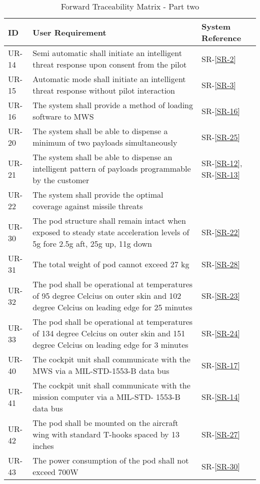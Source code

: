 \documentclass[Main]{subfiles}
\begin{document}
\begin{table}[htbp]
	\centering
	\begin{tabular}{l p{10cm} l} \hline
	ID & User Requirement & System Reference \\\hline
	UR-14 & Semi automatic shall initiate an intelligent threat response upon consent from the pilot & SR-\ref{SR-2} \\
	UR-15 &  Automatic mode shall initiate an intelligent threat response without pilot interaction & SR-\ref{SR-3} \\
	UR-16 &  The system shall provide a method of loading software to MWS & SR-\ref{SR-16} \\
	UR-20 & The system shall be able to dispense a minimum of two payloads simultaneously & SR-\ref{SR-25} \\
	UR-21 & The system shall be able to dispense an intelligent pattern of payloads programmable
	by the customer & SR-\ref{SR-12}, SR-\ref{SR-13} \\
	UR-22 &  The system shall provide the optimal coverage against missile threats &  \\ %
	UR-30 & The pod structure shall remain intact when exposed to steady state acceleration
	levels of 5g fore 2.5g aft, 25g up, 11g down & SR-\ref{SR-22} \\
	UR-31 & The total weight of pod cannot exceed 27 kg & SR-\ref{SR-28} \\
	UR-32 & The pod shall be operational at temperatures of 95 degree Celcius on outer skin and
	102 degree Celcius on leading edge for 25 minutes & SR-\ref{SR-23} \\
	UR-33 & The pod shall be operational at temperatures of 134 degree Celcius on outer skin
	and 151 degree Celcius on leading edge for 3 minutes  & SR-\ref{SR-24} \\
	UR-40 & The cockpit unit shall communicate with the MWS via a MIL-STD-1553-B data
	bus & SR-\ref{SR-17} \\
	UR-41 & The cockpit unit shall communicate with the mission computer via a MIL-STD-
	1553-B data bus & SR-\ref{SR-14} \\
	UR-42 &  The pod shall be mounted on the aircraft wing with standard T-hooks spaced by
	13 inches & SR-\ref{SR-27} \\
	UR-43 & The power consumption of the pod shall not exceed 700W & SR-\ref{SR-30} \\\hline
	\end{tabular}

\caption{Forward Traceability Matrix - Part two}
\label{Tab:ForwardPartTwo}
\end{table}
\end{document}
